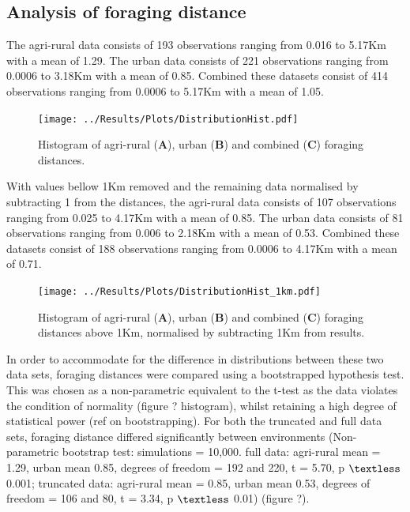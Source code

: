 \documentclass[11pt,usenames,dvipsnames,a4paper]{article}
\begin{document}
\subsection{Analysis of foraging distance}

\begin{linenumbers}
\hspace{\parindent}
The agri-rural data consists of 193 observations ranging from 0.016 to 5.17Km with a mean of 1.29. The urban data consists of 221 observations ranging from 0.0006 to 3.18Km with a mean of 0.85. Combined these datasets consist of 414 observations ranging from 0.0006 to 5.17Km with a mean of 1.05.
\end{linenumbers}

\begin{figure}[H]
	\centering
	\texttt{[image: ../Results/Plots/DistributionHist.pdf]}
	\caption{Histogram of agri-rural (\textbf{A}), urban (\textbf{B}) and combined (\textbf{C}) foraging distances.}
\end{figure}
\begin{linenumbers}

With values bellow 1Km removed and the remaining data normalised by subtracting 1 from the distances, the agri-rural data consists of 107 observations ranging from 0.025 to 4.17Km with a mean of 0.85. The urban data consists of 81 observations ranging from 0.006 to 2.18Km with a mean of 0.53. Combined these datasets consist of 188 observations ranging from 0.0006 to 4.17Km with a mean of 0.71.
\end{linenumbers}
\begin{figure}[H]
	\centering
	\texttt{[image: ../Results/Plots/DistributionHist\_1km.pdf]}
	\caption{Histogram of agri-rural (\textbf{A}), urban (\textbf{B}) and combined (\textbf{C}) foraging distances above 1Km, normalised by subtracting 1Km from results.}
\end{figure}
\begin{linenumbers}

In order to accommodate for the difference in distributions between these two data sets, foraging distances were compared using a bootstrapped hypothesis test. This was chosen as a non-parametric equivalent to the t-test as the data violates the condition of normality (figure ? histogram), whilst retaining a high degree of statistical power (ref on bootstrapping). For both the truncated and full data sets, foraging distance differed significantly between environments (Non-parametric bootstrap test: simulations = 10,000. full data: agri-rural mean = 1.29, urban mean 0.85, degrees of freedom = 192 and 220, t = 5.70, p $\textless$ 0.001; truncated data: agri-rural mean = 0.85, urban mean 0.53, degrees of freedom = 106 and 80, t = 3.34, p $\textless$ 0.01) (figure ?). 
\end{linenumbers}
\end{document}
